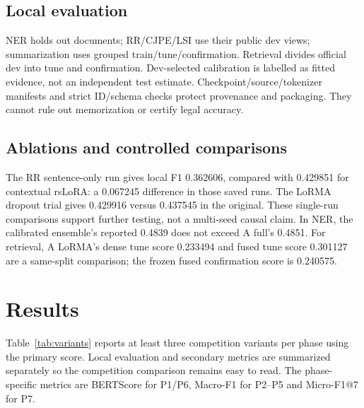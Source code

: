 \documentclass[11pt, oneside]{article}
\begin{document}
\subsection{Local evaluation}
NER holds out documents; RR/CJPE/LSI use their public dev views; summarization uses
grouped train/tune/confirmation. Retrieval divides official dev into tune and confirmation.
Dev-selected calibration is labelled as fitted evidence, not an independent test
estimate. Checkpoint/source/tokenizer manifests and strict ID/schema checks protect
provenance and packaging. They cannot rule out memorization or certify legal accuracy.

\subsection{Ablations and controlled comparisons}
The RR sentence-only run gives local F1 0.362606, compared with 0.429851 for contextual
rsLoRA: a 0.067245 difference in those saved runs. The LoRMA dropout trial gives
0.429916 versus 0.437545 in the original. These single-run comparisons support further
testing, not a multi-seed causal claim. In NER, the calibrated ensemble's reported
0.4839 does not exceed A full's 0.4851. For retrieval, A LoRMA's dense tune score
0.233494 and fused tune score 0.301127 are a same-split comparison; the frozen fused
confirmation score is 0.240575.

\section{Results}
Table~\ref{tab:variants} reports at least three competition variants per phase using
the primary score. Local evaluation and secondary metrics are summarized separately
so the competition comparison remains easy to read. The phase-specific metrics are
BERTScore for P1/P6, Macro-F1 for P2--P5 and Micro-F1@7 for P7.
\end{document}
